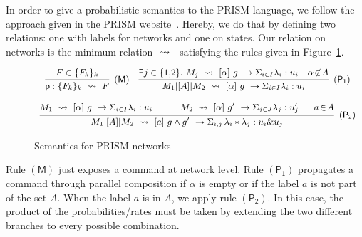  In order to give a probabilistic semantics to the
PRISM language, we follow the approach given in the PRISM
website~\cite{prismemantics}.  Hereby, we do that by defining two
relations: one with labels for networks and one on states. Our
relation on networks is the minimum relation $\ \stackrel{}{\rightsquigarrow}\ {}$
satisfying the rules given in Figure~\ref{fig:semantics}.
% 
\begin{figure}[t]
  \begin{displaymath}\small
    \begin{array}{ccc}
      \infer[\mathsf{(M)}]
      { {\role{p}:\{F_k\}_k} \prismred{} F
      }
      {
      F\in\{F_k\}_k
      }
      \quad
      \infer[\mathsf{(P_1)}]
      {M_1\ppp A M_2\prismred{}\command {\alpha}g\lambda u
      }
      {
      \exists j\in\{1,\!2\}.\ 
      M_j\prismred{} \command {\alpha}g\lambda u
      & \alpha\!\not\in\! A
        }
      \\\\
      \infer[\mathsf{(P_2)}]
      {M_1\ppp A M_2\prismred{}
      \commandBase a{g\land g'}
      {\Sigma_{i,j}\,\lambda_i*\lambda_j}: {u_i\& u_j} 
      }
      {
      M_1\prismred{}\command {\alpha}g\lambda u
      \quad&\quad 
        M_2\prismred{}\commandBase {\alpha} {g'} \Sigma_{j\in J}\lambda_j: u'_j
      \ &\
             a\!\in\! A}
    \end{array}
  \end{displaymath}
  \caption{Semantics for PRISM networks} 
  \label{fig:semantics}
\end{figure}
Rule $\mathsf{(M)}$ just exposes a command at network level. Rule
$\mathsf{(P_1)}$ propagates a command through parallel composition if
$\alpha$ is empty or if the label $a$ is not part of the set $A$. When
the label $a$ is in $A$, we apply rule $\mathsf{(P_2)}$. In this case,
the product of the probabilities/rates must be taken by extending the
two different branches to every possible combination. 

